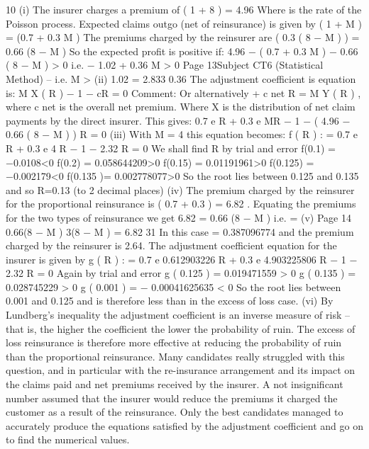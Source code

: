 10
(i)
The insurer charges a premium of \lambda  \times  ( 1  + 8  )  = 4.96 \lambda 
Where \lambda  is the rate of the Poisson process. Expected claims outgo (net of
reinsurance) is given by \lambda  \times  ( 1  + M  ) = \lambda  (0.7 + 0.3 M )
The premiums charged by the reinsurer are
\lambda  \times  ( 0.3 \times  ( 8 − M )  ) = 0.66 \lambda  (8 − M )
So the expected profit is positive if:
4.96 \lambda  − \lambda  ( 0.7 + 0.3 M ) − 0.66 \lambda  ( 8 − M ) > 0
i.e.
− 1.02 + 0.36 M > 0
Page 13Subject CT6 (Statistical Method) – %
i.e.
M >
(ii)
1.02
= 2.833
0.36
The adjustment coefficient is equation is:
M X ( R ) − 1 − cR = 0
Comment: Or alternatively \lambda  + c net R = \lambda  M Y ( R ) , where c net is the overall net
premium.
Where X is the distribution of net claim payments by the direct insurer. This
gives:
0.7 e R + 0.3 e MR − 1 − ( 4.96 − 0.66 ( 8 − M ) ) R = 0
(iii)
With M = 4 this equation becomes:
f ( R ) : = 0.7 e R + 0.3 e 4 R − 1 − 2.32 R = 0
We shall find R by trial and error
f(0.1) = −0.0108<0
f(0.2) = 0.058644209>0
f(0.15) = 0.01191961>0
f(0.125) = −0.002179<0
f(0.135 )= 0.002778077>0
So the root lies between 0.125 and 0.135 and so R=0.13 (to 2 decimal places)
(iv)
The premium charged by the reinsurer for the proportional reinsurance is
\lambda  \times  \alpha  {} \times  ( 0.7 + 0.3  ) = 6.82 \alpha \lambda  .
Equating the premiums for the two types of reinsurance we get
6.82 \alpha \lambda  = 0.66 \lambda  (8 − M )
i.e.
\alpha =
(v)
Page 14
0.66(8 − M ) 3(8 − M )
=
6.82
31
In this case \alpha  = 0.387096774 and the premium charged by the reinsurer is
2.64\lambda  .%
The adjustment coefficient equation for the insurer is given by
g ( R ) : = 0.7 e 0.612903226 R + 0.3 e 4.903225806 R − 1 − 2.32 R = 0
Again by trial and error
g ( 0.125 ) = 0.019471559 > 0
g ( 0.135 ) = 0.028745229 > 0
g ( 0.001 ) = − 0.00041625635 < 0
So the root lies between 0.001 and 0.125 and is therefore less than in the
excess of loss case.
(vi)
By Lundberg’s inequality the adjustment coefficient is an inverse measure of risk – that is, the higher the coefficient the lower the probability of ruin. The
excess of loss reinsurance is therefore more effective at reducing the probability of ruin than the proportional reinsurance.
Many candidates really struggled with this question, and in particular with the re-insurance arrangement and its impact on the claims paid and net premiums received by the insurer. A
not insignificant number assumed that the insurer would reduce the premiums it charged the customer as a result of the reinsurance. Only the best candidates managed to accurately
produce the equations satisfied by the adjustment coefficient and go on to find the numerical values.


